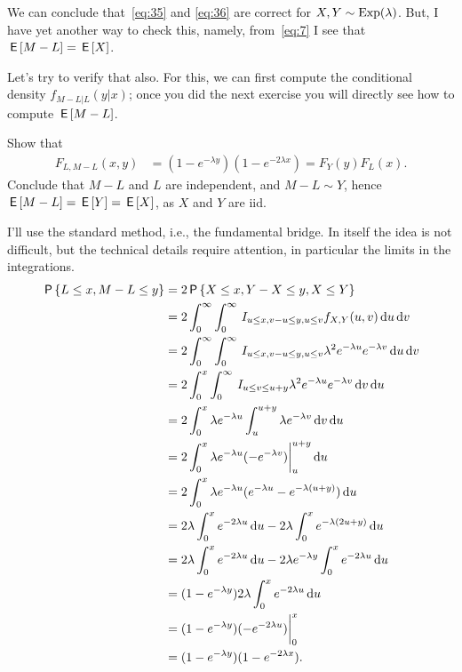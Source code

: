 \documentclass[a4paper,11pt]{article}
\begin{document}
We can conclude that~\cref{eq:35} and \cref{eq:36} are correct for $X,Y\sim\mathrm{Exp}(\lambda)$.
But, I have yet another way to check this, namely, from~\cref{eq:7} I see that $\,\mathsf{E}\left[M-L\right] = \,\mathsf{E}\left[X\right]$.

Let's try to verify that also.
For this, we can first compute the conditional density $f_{M-L| L}(y| x)$; once you did the next exercise you will directly see how to compute $\,\mathsf{E}\left[M-L\right]$.

\begin{exercise}\label{ex:5}
Show that 
\begin{align}  \label{eq:23}
F_{L,M-L}(x,y) &= (1-e^{-\lambda y})(1- e^{-2\lambda x}) = F_Y(y) F_L(x).
\end{align}
Conclude that $M-L$ and $L$ are independent, and $M-L\sim Y$, hence $\,\mathsf{E}\left[M-L\right] = \,\mathsf{E}\left[Y\right] = \,\mathsf{E}\left[X\right]$, as $X$ and $Y$ are iid.
\begin{solution}
I'll use the standard method, i.e., the fundamental bridge.
In itself the idea is not difficult, but the technical details require attention, in particular the limits in the integrations.
\begin{align} 
\,\mathsf{P}\left\{L\leq x, M-L\leq y\right\} 
&= 2\,\mathsf{P}\left\{X\leq x, Y-X \leq y, X \leq Y\right\} \\
&= 2\int_0^{\infty} \int_0^{\infty} \,I_{u\leq x, v-u\leq y, u \leq v} f_{X,Y}(u, v)  \,\textrm{d}u \,\textrm{d}v\\
&= 2\int_0^{\infty} \int_0^{\infty} \,I_{u\leq x, v-u\leq y, u\leq v} \lambda^2e^{-\lambda u}e^{-\lambda v}\,\textrm{d}u \,\textrm{d}v\\
&= 2\int_0^{x} \int_0^{\infty} \,I_{u\leq v\leq u+y} \lambda^2e^{-\lambda u}e^{-\lambda v}\,\textrm{d}v \,\textrm{d}u\\
&= 2\int_0^{x} \lambda e^{-\lambda u} \int_u   ^{u + y}  \lambda e^{-\lambda v}\,\textrm{d}v \,\textrm{d}u\\
&= 2\int_0^{x} \lambda e^{-\lambda u} (-e^{-\lambda v}) \biggr|_u^{u+y}\,\textrm{d}u \\
&= 2\int_0^{x} \lambda e^{-\lambda u} (e^{-\lambda u} - e^{-\lambda (u+y)})\,\textrm{d}u \\
&= 2\lambda\int_0^{x}  e^{-2 \lambda u}\,\textrm{d}u  - 2\lambda \int_{0}^{x} e^{-\lambda (2u+y)}\,\textrm{d}u \\
&= 2\lambda\int_0^{x}  e^{-2 \lambda u}\,\textrm{d}u  - 2\lambda e^{-\lambda y }\int_{0}^{x} e^{-2 \lambda u}\,\textrm{d}u \\
&= (1-e^{-\lambda y}) 2 \lambda \int_0^{x} e^{-2 \lambda u} \,\textrm{d}u\\ 
&= (1-e^{-\lambda y}) ( -e^{-2\lambda u}) \biggr|_0^{x} \\ 
&= (1-e^{-\lambda y})(1- e^{-2\lambda x}).
\end{align}
\end{solution}
\end{exercise}
\end{document}
